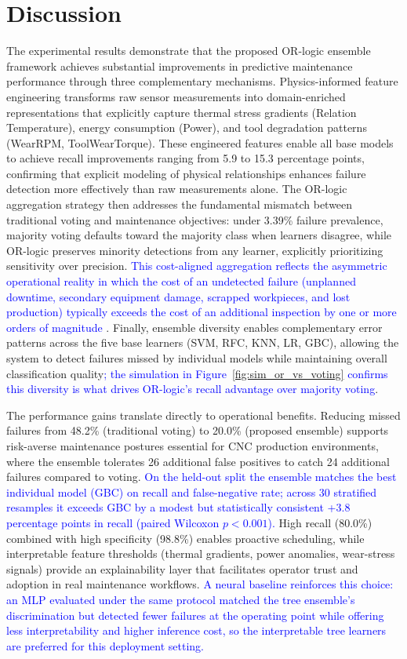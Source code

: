 \documentclass[final,5p, twocolumn]{elsarticle}
\begin{document}
\section{Discussion}\label{sec:discussion}

The experimental results demonstrate that the proposed OR-logic ensemble framework achieves substantial improvements in predictive maintenance performance through three complementary mechanisms. Physics-informed feature engineering transforms raw sensor measurements into domain-enriched representations that explicitly capture thermal stress gradients (Relation Temperature), energy consumption (Power), and tool degradation patterns (WearRPM, ToolWearTorque). These engineered features enable all base models to achieve recall improvements ranging from 5.9 to 15.3 percentage points, confirming that explicit modeling of physical relationships enhances failure detection more effectively than raw measurements alone. The OR-logic aggregation strategy then addresses the fundamental mismatch between traditional voting and maintenance objectives: under 3.39\% failure prevalence, majority voting defaults toward the majority class when learners disagree, while OR-logic preserves minority detections from any learner, explicitly prioritizing sensitivity over precision. \textcolor{blue}{This cost-aligned aggregation reflects the asymmetric operational reality in which the cost of an undetected failure (unplanned downtime, secondary equipment damage, scrapped workpieces, and lost production) typically exceeds the cost of an additional inspection by one or more orders of magnitude \cite{florian2021machine}}. Finally, ensemble diversity enables complementary error patterns across the five base learners (SVM, RFC, KNN, LR, GBC), allowing the system to detect failures missed by individual models while maintaining overall classification quality\textcolor{blue}{; the simulation in Figure~\ref{fig:sim_or_vs_voting} confirms this diversity is what drives OR-logic's recall advantage over majority voting}.

The performance gains translate directly to operational benefits. Reducing missed failures from 48.2\% (traditional voting) to 20.0\% (proposed ensemble) supports risk-averse maintenance postures essential for CNC production environments, where the ensemble tolerates 26 additional false positives to catch 24 additional failures compared to voting. \textcolor{blue}{On the held-out split the ensemble matches the best individual model (GBC) on recall and false-negative rate; across 30 stratified resamples it exceeds GBC by a modest but statistically consistent +3.8 percentage points in recall (paired Wilcoxon $p<0.001$).} High recall (80.0\%) combined with high specificity (98.8\%) enables proactive scheduling, while interpretable feature thresholds (thermal gradients, power anomalies, wear-stress signals) provide an explainability layer that facilitates operator trust and adoption in real maintenance workflows. \textcolor{blue}{A neural baseline reinforces this choice: an MLP evaluated under the same protocol matched the tree ensemble's discrimination but detected fewer failures at the operating point while offering less interpretability and higher inference cost, so the interpretable tree learners are preferred for this deployment setting.}
\end{document}
